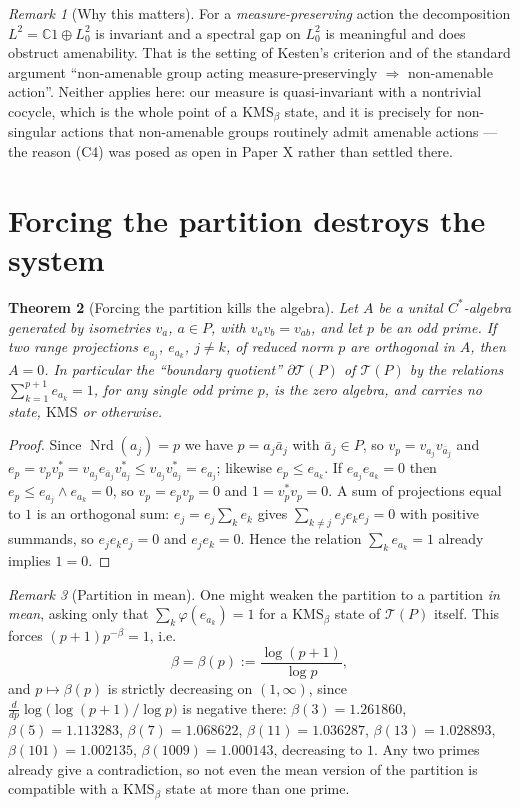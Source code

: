 \documentclass[11pt]{amsart}
\numberwithin{equation}{section}
\newtheorem{theorem}{Theorem}[section]
\theoremstyle{definition}
\theoremstyle{remark}
\newtheorem{remark}[theorem]{Remark}
\newcommand{\C}{\mathbb{C}}
\newcommand{\cT}{\mathcal{T}}
\newcommand{\Nrd}{\operatorname{Nrd}}
\begin{document}
\begin{remark}[Why this matters]\label{rem:whymatters}
For a \emph{measure-preserving} action the decomposition $L^2=\C1\oplus L^2_0$ is invariant
and a spectral gap on $L^2_0$ is meaningful and does obstruct amenability. That is the
setting of Kesten's criterion and of the standard argument ``non-amenable group acting
measure-preservingly $\Rightarrow$ non-amenable action''. Neither applies here: our measure is
quasi-invariant with a nontrivial cocycle, which is the whole point of a
$\mathrm{KMS}_\beta$ state, and it is precisely for non-singular actions that non-amenable
groups routinely admit amenable actions \cite{AD,Zimmer} --- the reason (C4) was posed as
open in Paper X rather than settled there.
\end{remark}

\section{Forcing the partition destroys the system}

\begin{theorem}[Forcing the partition kills the algebra]\label{thm:noboundary}
Let $A$ be a unital $C^*$-algebra generated by isometries $v_a$, $a\in P$, with
$v_av_b=v_{ab}$, and let $p$ be an odd prime. If two range projections $e_{a_j}$, $e_{a_k}$,
$j\ne k$, of reduced norm $p$ are orthogonal in $A$, then $A=0$. In particular the
``boundary quotient'' $\partial\cT(P)$ of $\cT(P)$ by the relations
$\sum_{k=1}^{p+1}e_{a_k}=1$, for any single odd prime $p$, is the zero algebra, and carries
no state, $\mathrm{KMS}$ or otherwise.
\end{theorem}

\begin{proof}
Since $\Nrd(a_j)=p$ we have $p=a_j\bar a_j$ with $\bar a_j\in P$, so
$v_p=v_{a_j}v_{\bar a_j}$ and $e_p=v_pv_p^*=v_{a_j}e_{\bar a_j}v_{a_j}^*\le v_{a_j}v_{a_j}^*=e_{a_j}$;
likewise $e_p\le e_{a_k}$. If $e_{a_j}e_{a_k}=0$ then $e_p\le e_{a_j}\wedge e_{a_k}=0$, so
$v_p=e_pv_p=0$ and $1=v_p^*v_p=0$. A sum of projections equal to $1$ is an orthogonal sum:
$e_j=e_j\sum_ke_k$ gives $\sum_{k\ne j}e_je_ke_j=0$ with positive summands, so
$e_je_ke_j=0$ and $e_je_k=0$. Hence the relation $\sum_ke_{a_k}=1$ already implies $1=0$.
\end{proof}

\begin{remark}[Partition in mean]\label{rem:betavals}
One might weaken the partition to a partition \emph{in mean}, asking only that
$\sum_k\varphi(e_{a_k})=1$ for a $\mathrm{KMS}_\beta$ state of $\cT(P)$ itself. This forces
$(p+1)p^{-\beta}=1$, i.e.
\[
\beta=\beta(p):=\frac{\log(p+1)}{\log p},
\]
and $p\mapsto\beta(p)$ is strictly decreasing on $(1,\infty)$, since
$\frac{d}{dp}\log\bigl(\log(p+1)/\log p\bigr)$ is negative there: $\beta(3)=1.261860$,
$\beta(5)=1.113283$, $\beta(7)=1.068622$, $\beta(11)=1.036287$, $\beta(13)=1.028893$,
$\beta(101)=1.002135$, $\beta(1009)=1.000143$, decreasing to $1$. Any two primes already
give a contradiction, so not even the mean version of the partition is compatible with a
$\mathrm{KMS}_\beta$ state at more than one prime.
\end{remark}
\end{document}
